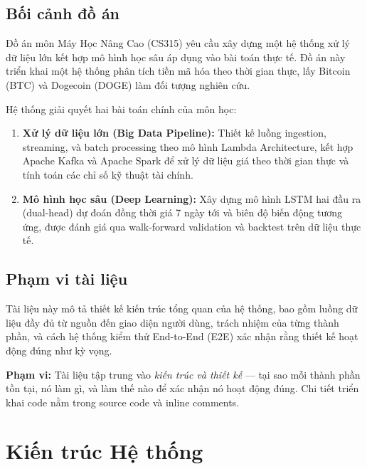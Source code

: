\documentclass[12pt, a4paper]{article}
\newenvironment{infobox}{%
  \begin{lrbox}{\infoBoxContent}%
  \begin{minipage}[t]{\dimexpr\linewidth-18pt\relax}%
  \setlength{\parskip}{4pt}\small\vspace{4pt}%
}{%
  \vspace{4pt}%
  \end{minipage}%
  \end{lrbox}%
  \par\smallskip\noindent
  \setlength{\fboxsep}{6pt}\setlength{\fboxrule}{0.6pt}%
  \fcolorbox{blue!35!white}{blue!5!white}{\usebox{\infoBoxContent}}%
  \par\smallskip
}
\begin{document}
\subsection{Bối cảnh đồ án}

Đồ án môn Máy Học Nâng Cao (CS315) yêu cầu xây dựng một hệ thống xử lý dữ liệu
lớn kết hợp mô hình học sâu áp dụng vào bài toán thực tế. Đồ án này triển khai
một hệ thống phân tích tiền mã hóa theo thời gian thực, lấy Bitcoin (BTC) và
Dogecoin (DOGE) làm đối tượng nghiên cứu.

Hệ thống giải quyết hai bài toán chính của môn học:

\begin{enumerate}
  \item \textbf{Xử lý dữ liệu lớn (Big Data Pipeline):} Thiết kế luồng ingestion,
    streaming, và batch processing theo mô hình Lambda Architecture, kết hợp Apache
    Kafka và Apache Spark để xử lý dữ liệu giá theo thời gian thực và tính toán
    các chỉ số kỹ thuật tài chính.

  \item \textbf{Mô hình học sâu (Deep Learning):} Xây dựng mô hình LSTM hai đầu ra
    (dual-head) dự đoán đồng thời giá 7 ngày tới và biên độ biến động tương ứng,
    được đánh giá qua walk-forward validation và backtest trên dữ liệu thực tế.
\end{enumerate}

\subsection{Phạm vi tài liệu}

Tài liệu này mô tả thiết kế kiến trúc tổng quan của hệ thống, bao gồm luồng dữ liệu
đầy đủ từ nguồn đến giao diện người dùng, trách nhiệm của từng thành phần, và cách
hệ thống kiểm thử End-to-End (E2E) xác nhận rằng thiết kế hoạt động đúng như kỳ vọng.

\begin{infobox}
\textbf{Phạm vi:} Tài liệu tập trung vào \textit{kiến trúc và thiết kế} ---
tại sao mỗi thành phần tồn tại, nó làm gì, và làm thế nào để xác nhận nó hoạt động
đúng. Chi tiết triển khai code nằm trong source code và inline comments.
\end{infobox}

\section{Kiến trúc Hệ thống}
\end{document}

